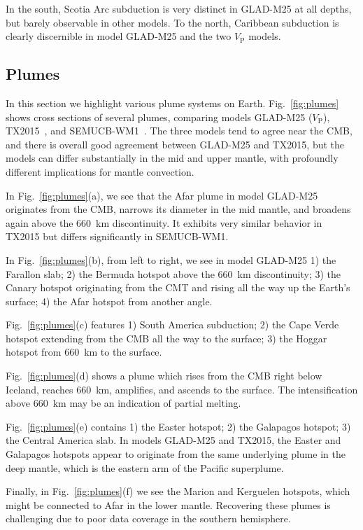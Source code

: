 \documentclass[extra,mreferee]{gji}
\begin{document}
In the south,
Scotia Arc subduction is very distinct in GLAD-M25 at all depths,
but barely observable in other models.
To the north,
Caribbean subduction is clearly discernible in model GLAD-M25 and the two $V_\textrm{P}$ models.

\subsection{Plumes}
\label{section:plumes}

In this section we highlight various plume systems on Earth. Fig.~\ref{fig:plumes}
shows cross sections of several plumes, comparing models GLAD-M25 ($V_\textrm{P}$),
TX2015~\citep[$V_\textrm{S}$;][]{TX2015}, and SEMUCB-WM1~\citep[$V_\textrm{S}$;][]{french2015broad}.
The three models tend to agree near the CMB,
and there is overall good agreement between GLAD-M25 and TX2015,
but the models can differ substantially in the mid and upper mantle,
with profoundly different implications for mantle
convection.

In Fig.~\ref{fig:plumes}(a),
we see that the Afar plume in model GLAD-M25 originates from the CMB, narrows its diameter
in the mid mantle, and broadens again above the 660~km discontinuity.
It exhibits
very similar behavior in TX2015 but differs significantly in SEMUCB-WM1.  

In Fig.~\ref{fig:plumes}(b), from left to right, we see in model GLAD-M25 1) the Farallon
slab; 2) the Bermuda hotspot above the 660~km discontinuity; 3) the Canary hotspot originating from the CMT and
rising all the way up the Earth's surface; 4) the Afar hotspot from another angle.

Fig.~\ref{fig:plumes}(c) features 1) South America subduction; 2) the Cape Verde hotspot extending from the CMB all the way to the surface; 3) the Hoggar hotspot from 660~km to the surface. 

Fig.~\ref{fig:plumes}(d) shows a plume which rises from the CMB right below Iceland, reaches 660~km, amplifies,
and ascends to the surface.
The intensification above 660~km may be an indication of partial melting.

Fig.~\ref{fig:plumes}(e) contains 1) the Easter hotspot; 2) the Galapagos
hotspot; 3) the Central America slab.
In models GLAD-M25 and TX2015,
the Easter and Galapagos hotspots appear to originate from the same underlying plume in the deep mantle,
which is the eastern arm of the Pacific superplume.

Finally,
in Fig.~\ref{fig:plumes}(f) we see the Marion and Kerguelen hotspots, which might be connected to Afar in the lower mantle.
Recovering these plumes is challenging due to poor data coverage in the southern hemisphere.
\end{document}
